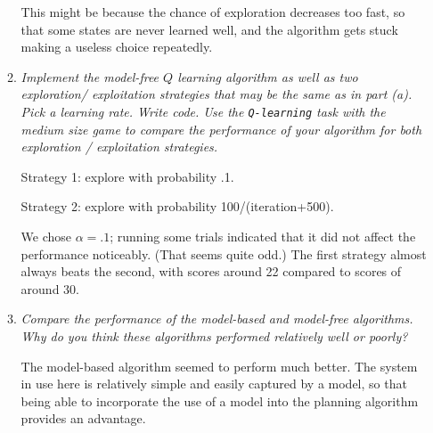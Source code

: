 \documentclass{article}
\begin{document}
\begin{enumerate}
\begin{enumerate}
    This might be because the chance of exploration decreases too
    fast, so that some states are never learned well, and the
    algorithm gets stuck making a useless choice repeatedly.

  \item \emph{Implement the model-free $Q$ learning algorithm as well
    as two exploration/ exploitation strategies that may be the same
    as in part (a). Pick a learning rate. Write code. Use the
    \texttt{Q-learning} task with the medium size game to compare the
    performance of your algorithm for both exploration / exploitation
    strategies.}

    Strategy 1: explore with probability .1.

    Strategy 2: explore with probability 100/(iteration+500).

    We chose $\alpha=.1$; running some trials indicated that it did
    not affect the performance noticeably. (That seems quite odd.) The
    first strategy almost always beats the second, with scores around
    22 compared to scores of around 30.

  \item \emph{Compare the performance of the model-based and
    model-free algorithms. Why do you think these algorithms performed
    relatively well or poorly?}

    The model-based algorithm seemed to perform much better. The
    system in use here is relatively simple and easily captured by a
    model, so that being able to incorporate the use of a model into
    the planning algorithm provides an advantage.

  \end{enumerate}

\end{enumerate}
\end{document}
